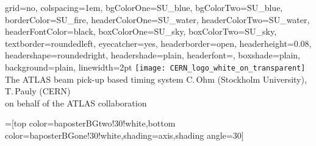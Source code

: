 \documentclass[portrait,final]{baposter}
\begin{document}

\newlength{\leftimgwidth}
\begin{poster}%
  {
  grid=no,
  colspacing=1em,
  bgColorOne=SU_blue,
  bgColorTwo=SU_blue,
  borderColor=SU_fire,
  headerColorOne=SU_water,
  headerColorTwo=SU_water,
  headerFontColor=black,
  boxColorOne=SU_sky,
  boxColorTwo=SU_sky,
  textborder=roundedleft,
  eyecatcher=yes,
  headerborder=open,
  headerheight=0.08\textheight,
  headershape=roundedright,
  headershade=plain,
  headerfont=\Large\textsf, %
  boxshade=plain,
  background=plain,
  linewidth=2pt
  }
  {\texttt{[image: CERN\_logo\_white\_on\_transparent]}} %
  {\sf %
  \color{white}The ATLAS beam pick-up based timing system}
  {\sf %
  \color{SU_sky}C.\,Ohm (Stockholm University), T.\,Pauly (CERN)
  \\on behalf of the ATLAS collaboration
  }
  {%
  }

  =[top color=baposterBGtwo!30!white,bottom color=baposterBGone!30!white,shading=axis,shading angle=30]

     \setlength{\leftimgwidth}{0.78em+8.0em}


\end{poster}
\end{document}
